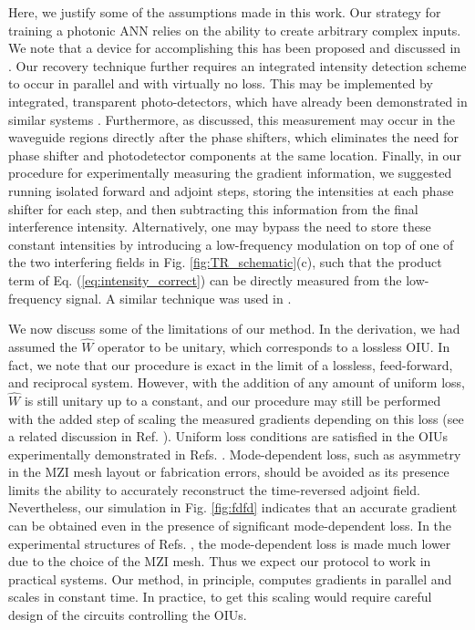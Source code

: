 Here, we justify some of the assumptions made in this work.  Our strategy for training a photonic ANN relies on the ability to create arbitrary complex inputs.  We note that a device for accomplishing this has been proposed and discussed in \cite{Miller2017}.  Our recovery technique further requires an integrated intensity detection scheme to occur in parallel and with virtually no loss.  This may be implemented by integrated, transparent photo-detectors, which have already been demonstrated in similar systems \cite{Annoni2017}.  Furthermore, as discussed, this measurement may occur in the waveguide regions directly after the phase shifters, which eliminates the need for phase shifter and photodetector components at the same location.  Finally, in our procedure for experimentally measuring the gradient information, we suggested running isolated forward and adjoint steps, storing the intensities at each phase shifter for each step, and then subtracting this information from the final interference intensity. Alternatively, one may bypass the need to store these constant intensities by introducing a low-frequency modulation on top of one of the two interfering fields in Fig. \ref{fig:TR_schematic}(c), such that the product term of Eq. (\ref{eq:intensity_correct}) can be directly measured from the low-frequency signal.  A similar technique was used in \cite{Annoni2017}.


We now discuss some of the limitations of our method.  In the derivation, we had assumed the $\hat{W}$ operator to be unitary, which corresponds to a lossless OIU.  In fact, we note that our procedure is exact in the limit of a lossless, feed-forward, and reciprocal system.  However, with the addition of any amount of uniform loss, $\hat{W}$ is still unitary up to a constant, and our procedure may still be performed with the added step of scaling the measured gradients depending on this loss (see a related discussion in Ref. \cite{Miller2017}).  Uniform loss conditions are satisfied in the OIUs experimentally demonstrated in Refs. \cite{shen2017deep, miller_selfconfiguring_2013}.  Mode-dependent loss, such as asymmetry in the MZI mesh layout or fabrication errors, should be avoided as its presence limits the ability to accurately reconstruct the time-reversed adjoint field.  Nevertheless, our simulation in Fig. \ref{fig:fdfd} indicates that an accurate gradient can be obtained even in the presence of significant mode-dependent loss.  In the experimental structures of  Refs. \cite{shen2017deep, miller_selfconfiguring_2013}, the mode-dependent loss is made much lower due to the choice of the MZI mesh.  Thus we expect our protocol to work in practical systems.  Our method, in principle, computes gradients in parallel and scales in constant time.  In practice, to get this scaling would require careful design of the circuits controlling the OIUs.

